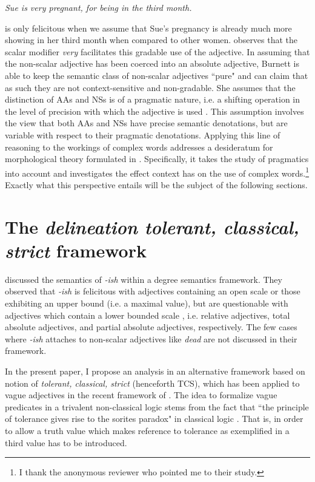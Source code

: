 \documentclass[output=paper]{langsci/langscibook}
\begin{document}
\ea \label{ex:harris:16}
	\itshape Sue is very pregnant, for being in the third month.
\z

 is only felicitous when we assume that Sue's pregnancy is already much more showing in her third month when compared to other women. \textcite[44]{Burnett2017} observes that the scalar modifier \textit{very} facilitates this gradable use of the adjective. In assuming that the non-scalar adjective has been coerced into an absolute adjective, Burnett is able to keep the semantic class of non-scalar adjectives ``pure" and can claim that as such they are not context-sensitive and non-gradable. She assumes that the distinction of AAs and NSs is of a pragmatic nature, i.e. a shifting operation in the level of precision with which the adjective is used \citeyearpar[95]{Burnett2017}. This assumption involves the view that both AAs and NSs have precise semantic denotations, but are variable with respect to their pragmatic denotations. Applying this line of reasoning to the workings of complex words addresses a desideratum for morphological theory formulated in \textcite[226]{Plagetal}. Specifically, it takes the study of pragmatics into account and investigates the effect context has on the use of complex words.\footnote{I thank the anonymous reviewer who pointed me to their study.} Exactly what this perspective entails will be the subject of the following sections.

\section{The \textit{delineation tolerant, classical, strict} framework}
\label{sec:deltcs} %

\citet{Bochnak2014} discussed the semantics of \textit{-ish} within a degree semantics framework. They observed that \textit{-ish} is felicitous with adjectives containing an open scale or those exhibiting an upper bound (i.e. a maximal value), but are questionable with adjectives which contain a lower bounded scale \citeyearpar[435--436]{Bochnak2014}, i.e. relative adjectives, total absolute adjectives, and partial absolute adjectives, respectively. The few cases where \textit{-ish} attaches to non-scalar adjectives like \textit{dead} are not discussed in their framework.

In the present paper, I propose an analysis in an alternative framework based on  notion of \textit{tolerant, classical, strict} (henceforth TCS), which has been applied to vague adjectives in the recent framework of \citet{Burnett2017}. The idea to formalize vague predicates in a trivalent non-classical logic stems from the fact that ``the principle of tolerance gives rise to the sorites paradox" in classical logic \citep[348]{Cobreros2012}. That is, in order to allow a truth value which makes reference to tolerance as exemplified in  a third value has to be introduced. %
\end{document}
